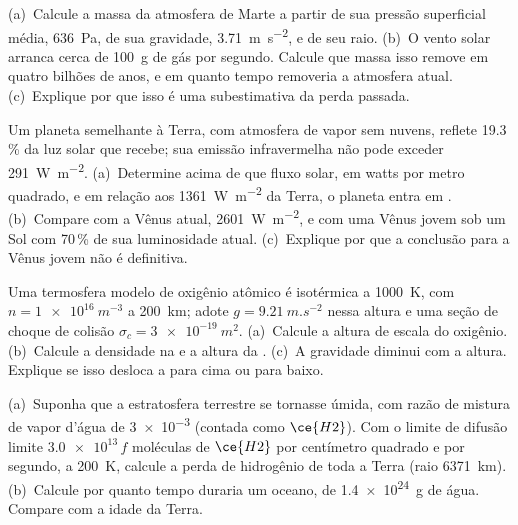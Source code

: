 \begin{exercise}[$\star\star$]\label{exo:b3:planetary-atmospheres:8}
(a)~Calcule a massa da atmosfera de Marte a partir de sua pressão superficial média,
\qty{636}{Pa}, de sua gravidade, \qty{3.71}{m.s^{-2}}, e de seu
raio. (b)~O vento solar arranca cerca de \qty{100}{g} de gás por segundo.
Calcule que massa isso remove em quatro bilhões de anos, e em quanto tempo
removeria a atmosfera atual. (c)~Explique por que isso é uma subestimativa da
perda passada.
\end{exercise}

\begin{exercise}[$\star\star$]\label{exo:b3:planetary-atmospheres:9}
Um planeta semelhante à Terra, com atmosfera de vapor sem nuvens, reflete 19.3\,\%
da luz solar que recebe; sua emissão infravermelha não pode exceder
\qty{291}{W.m^{-2}}. (a)~Determine acima de que fluxo solar, em watts por metro quadrado,
e em relação aos \qty{1361}{W.m^{-2}} da Terra, o planeta entra em .
(b)~Compare com a Vênus atual, \qty{2601}{W.m^{-2}}, e com uma Vênus jovem sob um Sol
com 70\,\% de sua luminosidade atual. (c)~Explique por que a
conclusão para a Vênus jovem não é definitiva.
\end{exercise}

\begin{exercise}[$\star\star\star$]\label{exo:b3:planetary-atmospheres:10}
Uma termosfera modelo de oxigênio atômico é isotérmica a \qty{1000}{K}, com
$n = \qty{1e16}{m^{-3}}$ a \qty{200}{km}; adote $g =
\qty{9.21}{m.s^{-2}}$ nessa altura e uma seção de choque de colisão
$\sigma_c = \qty{3e-19}{m^2}$. (a)~Calcule a altura de escala do oxigênio.
(b)~Calcule a densidade na  e a altura da .
(c)~A gravidade diminui com a altura. Explique se isso desloca a  para cima ou
para baixo.
\end{exercise}

\begin{exercise}[$\star\star\star$]\label{exo:b3:planetary-atmospheres:11}
(a)~Suponha que a estratosfera terrestre se tornasse úmida, com razão de mistura de
vapor d'água de \num{3e-3} (contada como $\ce{H2}$). Com o limite de difusão
limite $\num{3.0e13}\,f$ moléculas de $\ce{H2}$ por centímetro quadrado e por
segundo, a \qty{200}{K}, calcule a perda de hidrogênio de toda a
Terra (raio \qty{6371}{km}). (b)~Calcule por quanto tempo duraria um oceano,
de \qty{1.4e24}{g} de água. Compare com a idade da Terra.
\end{exercise}

